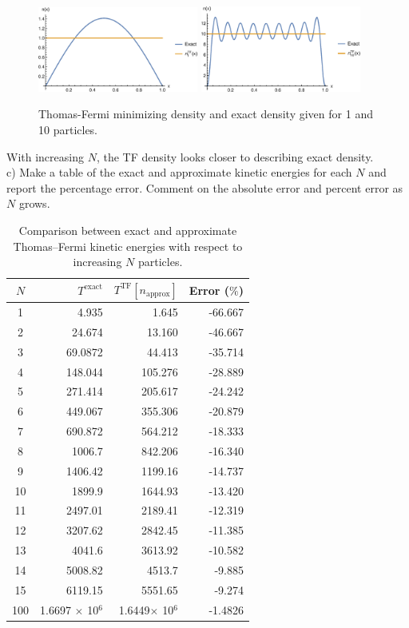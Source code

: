 \documentclass{article}
\begin{document}
  \begin{figure}[H]
    \centering
    \includegraphics[width=0.47\textwidth]{tf_onepart.eps}
    \includegraphics[width=0.47\textwidth]{tf_tenpart.eps}
    \caption{Thomas-Fermi minimizing density and exact density given
      for 1 and 10 particles.}
    \label{fig:tf_dens}
  \end{figure}

{\color{blue} With increasing $N$, the TF density looks closer to describing
  exact density.}
\\

\noindent c) Make a table of the exact and approximate kinetic energies
for each $N$ and report the percentage error.  Comment on the absolute error
and percent error as $N$ grows.

\begin{table}[H]
  \caption{Comparison between exact and approximate
    Thomas--Fermi kinetic energies with respect to increasing $N$ particles.}
  \centering
  \begin{tabular}{crrr}
    $N$ & $T^{\text{exact}}$ & $T^{\text{TF}}[n_{\text{approx}}]$ & Error ($\%$) \\
    \hline
     1 &4.935& 1.645 & -66.667 \\
     2 &24.674& 13.160 & -46.667 \\
     3 &69.0872& 44.413 &-35.714 \\
     4 &148.044& 105.276 &-28.889 \\
     5 &271.414& 205.617 &-24.242 \\
     6 &449.067& 355.306 &-20.879 \\
     7 &690.872& 564.212 &-18.333 \\
     8 &1006.7& 842.206 & -16.340 \\
     9 &1406.42& 1199.16 &-14.737 \\
     10&1899.9& 1644.93 & -13.420 \\
     11&2497.01& 2189.41 &-12.319 \\
     12&3207.62& 2842.45 &-11.385 \\
     13&4041.6& 3613.92 & -10.582 \\
     14&5008.82& 4513.7 & -9.885  \\
     15&6119.15& 5551.65 &-9.274  \\
    100&1.6697 $\times$ 10$^6$ & 1.6449$\times$ 10$^6$& -1.4826
  \end{tabular}
\end{table}
\end{document}
